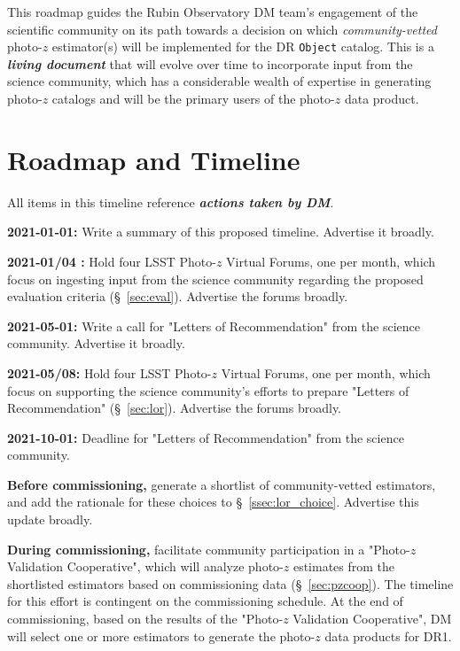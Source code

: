 \documentclass[DM,lsstdraft,toc]{lsstdoc}
\begin{document}
This roadmap guides the Rubin Observatory DM team's engagement of the scientific community on its path towards a decision on which \textit{community-vetted} photo-$z$ estimator(s) will be implemented for the DR {\tt Object} catalog.
This is a \textit{\textbf{living document}} that will evolve over time to incorporate input from the science community, which has a considerable wealth of expertise in generating photo-$z$ catalogs and will be the primary users of the photo-$z$ data product.


\clearpage
\section{Roadmap and Timeline}\label{sec:time}

All items in this timeline reference \textbf{\textit{actions taken by DM}}.

{\bf 2021-01-01:} Write a summary of this proposed timeline. Advertise it broadly.

{\bf 2021-01/04 :} Hold four LSST Photo-$z$ Virtual Forums, one per month, which focus on ingesting input from the science community regarding the proposed evaluation criteria (\S~\ref{sec:eval}). Advertise the forums broadly.

{\bf 2021-05-01:} Write a call for "Letters of Recommendation" from the science community. Advertise it broadly.

{\bf 2021-05/08:} Hold four LSST Photo-$z$ Virtual Forums, one per month, which focus on supporting the science community's efforts to prepare "Letters of Recommendation" (\S~\ref{sec:lor}). Advertise the forums broadly.

{\bf 2021-10-01:} Deadline for "Letters of Recommendation" from the science community.

{\bf Before commissioning,} generate a shortlist of community-vetted estimators, and add the rationale for these choices to \S~\ref{ssec:lor_choice}. Advertise this update broadly.

{\bf During commissioning,} facilitate community participation in a "Photo-$z$ Validation Cooperative", which will analyze photo-$z$ estimates from the shortlisted estimators based on commissioning data (\S~\ref{sec:pzcoop}).
The timeline for this effort is contingent on the commissioning schedule.
At the end of commissioning, based on the results of the "Photo-$z$ Validation Cooperative", DM will select one or more estimators to generate the photo-$z$ data products for DR1.
\end{document}
